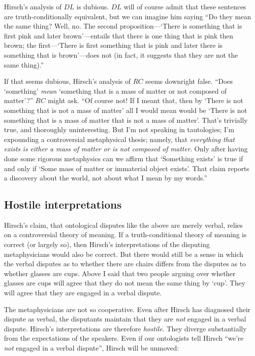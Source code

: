 \documentclass[12pt,twoside]{reedfancy}
\begin{document}
\begin{spacing}{1.25}
Hirsch's analysis of $DL$ is dubious.  $DL$ will of course admit that
these sentences are truth-conditionally equivalent, but we can imagine
him saying ``Do they mean the same thing?  Well, no.  The second
proposition---`There is something that is first pink and later
brown'---entails that there is one thing that is pink then brown; the
first---`There is first something that is pink and later there is
something that is brown'---does not (in fact, it suggests that they
are not the same thing).''

If that seems dubious, Hirsch's analysis of $RC$ seems downright
false.  ``Does `something' {\em mean} `something that is a mass of
matter or not composed of matter'?''  $RC$ might ask.  ``Of course
not!  If I meant that, then by `There is not something that is not a
mass of matter' all I would mean would be `There is not something that
is a mass of matter that is not a mass of matter'.  That's trivially
true, and thoroughly uninteresting.  But I'm not speaking in
tautologies; I'm expounding a controversial metaphysical thesis;
namely, that {\em everything that exists is either a mass of matter or
  is not composed of matter}.  Only after having done some rigorous
metaphysics can we affirm that `Something exists' is true if and only
if `Some mass of matter or immaterial object exists'.  That claim
reports a discovery about the world, not about what I mean by my
words.''

\subsection{Hostile interpretations}
\label{hostile}
Hirsch's claim, that ontological disputes like the above are merely
verbal, relies on a controversial theory of meaning.  If a
truth-conditional theory of meaning is correct (or largely so), then
Hirsch's interpretations of the disputing metaphysicians would also be
correct.  But there would still be a sense in which the verbal
disputes as to whether there are chairs differs from the disputes as
to whether glasses are cups.  Above I said that two people arguing
over whether glasses are cups will agree that they do not mean the
same thing by `cup'.  They will agree that they are engaged in a
verbal dispute.

The metaphysicians are not so cooperative.  Even after Hirsch has
diagnosed their dispute as verbal, the disputants maintain that they
are {\em not} engaged in a verbal dispute.  Hirsch's interpretations
are therefore \emph{hostile}.  They diverge substantially from the
expectations of the speakers.  Even if our ontologists tell Hirsch
``we're \emph{not} engaged in a verbal dispute'', Hirsch will be
unmoved:


\end{spacing}
\end{document}
